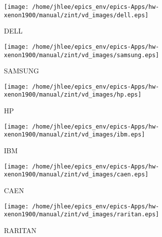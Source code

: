 \noindent
\vspace{0.6cm}
\begin{minipage}{.2\textwidth}
\begin{center}
\texttt{[image: /home/jhlee/epics\_env/epics-Apps/hw-xenon1900/manual/zint/vd\_images/dell.eps]}
\end{center}
\end{minipage}
\begin{minipage}{.7\textwidth}
DELL
\end{minipage}


\noindent
\vspace{0.6cm}
\begin{minipage}{.2\textwidth}
\begin{center}
\texttt{[image: /home/jhlee/epics\_env/epics-Apps/hw-xenon1900/manual/zint/vd\_images/samsung.eps]}
\end{center}
\end{minipage}
\begin{minipage}{.7\textwidth}
SAMSUNG
\end{minipage}


\noindent
\vspace{0.6cm}
\begin{minipage}{.2\textwidth}
\begin{center}
\texttt{[image: /home/jhlee/epics\_env/epics-Apps/hw-xenon1900/manual/zint/vd\_images/hp.eps]}
\end{center}
\end{minipage}
\begin{minipage}{.7\textwidth}
HP
\end{minipage}


\noindent
\vspace{0.6cm}
\begin{minipage}{.2\textwidth}
\begin{center}
\texttt{[image: /home/jhlee/epics\_env/epics-Apps/hw-xenon1900/manual/zint/vd\_images/ibm.eps]}
\end{center}
\end{minipage}
\begin{minipage}{.7\textwidth}
IBM
\end{minipage}


\noindent
\vspace{0.6cm}
\begin{minipage}{.2\textwidth}
\begin{center}
\texttt{[image: /home/jhlee/epics\_env/epics-Apps/hw-xenon1900/manual/zint/vd\_images/caen.eps]}
\end{center}
\end{minipage}
\begin{minipage}{.7\textwidth}
CAEN
\end{minipage}


\noindent
\vspace{0.6cm}
\begin{minipage}{.2\textwidth}
\begin{center}
\texttt{[image: /home/jhlee/epics\_env/epics-Apps/hw-xenon1900/manual/zint/vd\_images/raritan.eps]}
\end{center}
\end{minipage}
\begin{minipage}{.7\textwidth}
RARITAN
\end{minipage}


